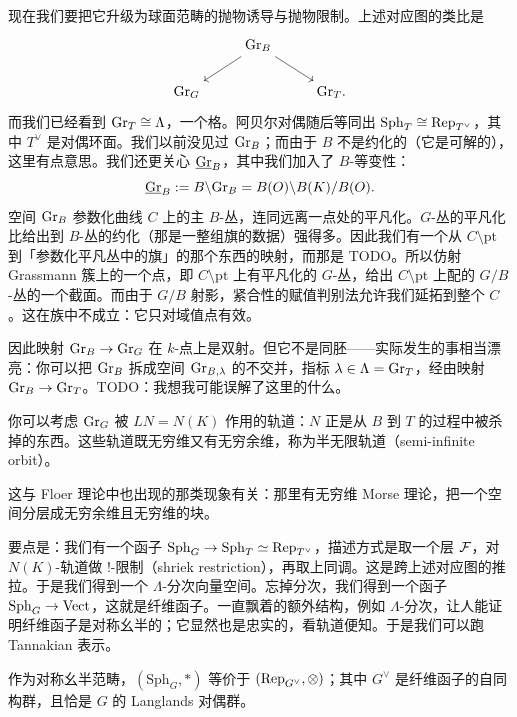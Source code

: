 现在我们要把它升级为球面范畴的抛物诱导与抛物限制。上述对应图的类比是
\[
  \begin{tikzcd}
    & \Gr_B \arrow[dl] \arrow[dr] & \\
    \Gr_G & & \Gr_T.
  \end{tikzcd}
\]
而我们已经看到 $\mathrm{Gr}_T\cong\Lambda$，一个格。阿贝尔对偶随后等同出 $\mathrm{Sph}_T\cong\operatorname{Rep}_{T^\vee}$，其中 $T^\vee$ 是对偶环面。我们以前没见过 $\mathrm{Gr}_B$；而由于 $B$ 不是约化的（它是可解的），这里有点意思。我们还更关心 $\underline{\mathrm{Gr}}_B$，其中我们加入了 $B$-等变性：
\[
  \underline{\mathrm{Gr}}_B := B\backslash\mathrm{Gr}_B = B(O)\backslash B(K)/B(O).
\]
空间 $\mathrm{Gr}_B$ 参数化曲线 $C$ 上的主 $B$-丛，连同远离一点处的平凡化。$G$-丛的平凡化比给出到 $B$-丛的约化（那是一整组旗的数据）强得多。因此我们有一个从 $C\setminus\mathrm{pt}$ 到「参数化平凡丛中的旗」的那个东西的映射，而那是 TODO。所以仿射 Grassmann 簇上的一个点，即 $C\setminus\mathrm{pt}$ 上有平凡化的 $G$-丛，给出 $C\setminus\mathrm{pt}$ 上配的 $G/B$-丛的一个截面。而由于 $G/B$ 射影，紧合性的赋值判别法允许我们延拓到整个 $C$。这在族中不成立：它只对域值点有效。

因此映射 $\mathrm{Gr}_B\to\mathrm{Gr}_G$ 在 $k$-点上是双射。但它不是同胚——实际发生的事相当漂亮：你可以把 $\mathrm{Gr}_B$ 拆成空间 $\mathrm{Gr}_{B,\lambda}$ 的不交并，指标 $\lambda\in\Lambda=\mathrm{Gr}_T$，经由映射 $\mathrm{Gr}_B\to\mathrm{Gr}_T$。TODO：我想我可能误解了这里的什么。

你可以考虑 $\mathrm{Gr}_G$ 被 $LN=N(K)$ 作用的轨道：$N$ 正是从 $B$ 到 $T$ 的过程中被杀掉的东西。这些轨道既无穷维又有无穷余维，称为半无限轨道（semi-infinite orbit）。

这与 Floer 理论中也出现的那类现象有关：那里有无穷维 Morse 理论，把一个空间分层成无穷余维且无穷维的块。

要点是：我们有一个函子 $\mathrm{Sph}_G\to\mathrm{Sph}_T\simeq\operatorname{Rep}_{T^\vee}$，描述方式是取一个层 $\mathcal{F}$，对 $N(K)$-轨道做 $!$-限制（shriek restriction），再取上同调。这是跨上述对应图的推拉。于是我们得到一个 $\Lambda$-分次向量空间。忘掉分次，我们得到一个函子 $\mathrm{Sph}_G\to\mathrm{Vect}$，这就是纤维函子。一直飘着的额外结构，例如 $\Lambda$-分次，让人能证明纤维函子是对称幺半的；它显然也是忠实的，看轨道便知。于是我们可以跑 Tannakian 表示。

\begin{theorem}[几何 Satake]
作为对称幺半范畴，$(\mathrm{Sph}_G,*)$ 等价于 $(\operatorname{Rep}_{G^\vee},\otimes)$；其中 $G^\vee$ 是纤维函子的自同构群，且恰是 $G$ 的 Langlands 对偶群。
\end{theorem}

